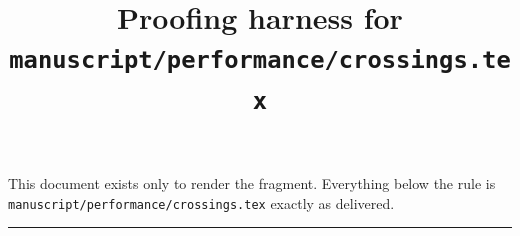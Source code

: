 \documentclass[10pt]{article}
\title{Proofing harness for \texttt{manuscript/performance/crossings.tex}}
\author{}
\date{}
\begin{document}
\maketitle

\noindent
This document exists only to render the fragment. Everything below the rule is
\verb|manuscript/performance/crossings.tex| exactly as delivered.

\hrule\vspace{1em}


\end{document}
